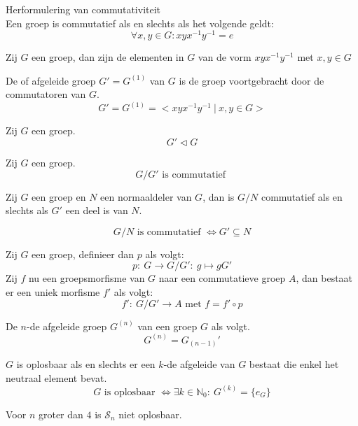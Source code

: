 \documentclass[main.tex]{subfiles}
\begin{document}
\begin{st}
Herformulering van commutativiteit\\
Een groep is commutatief als en slechts als het volgende geldt:
\[ \forall x,y \in G: xyx^{-1}y^{-1} = e \]
\end{st}

\begin{de}
Zij $G$ een groep, dan zijn de elementen in $G$ van de vorm $xyx^{-1}y^{-1}$ met $x,y\in G$ 
\end{de}

\begin{de}
De  of afgeleide groep $G' = G^{(1)}$ van $G$ is de groep voortgebracht door de commutatoren van $G$.
\[ G' = G^{(1)} = < xyx^{-1}y^{-1} \ |\ x,y\in G > \]
\end{de}

\begin{st}
Zij $G$ een groep.
\[ G' \triangleleft G \]
\end{st}

\begin{st}
Zij $G$ een groep.
\[ G/G' \text{ is commutatief } \]
\end{st}

\begin{st}
Zij $G$ een groep en $N$ een normaaldeler van $G$, dan is $G/N$ commutatief als en slechts als $G'$ een deel is van $N$.

\[ G/N \text{ is commutatief } \Leftrightarrow G' \subseteq N \]
\end{st}

\begin{st}
Zij $G$ een groep, definieer dan $p$ als volgt:
\[ p:\ G \rightarrow G/G':\ g \mapsto gG' \]
Zij $f$ nu een groepsmorfisme van $G$ naar een commutatieve groep $A$, dan bestaat er een uniek morfisme $f'$ als volgt:
\[ f':\ G/G' \rightarrow A \text{ met } f = f'\circ p \]
\end{st}

\begin{de}
De $n$-de afgeleide groep $G^{(n)}$ van een groep $G$ als volgt.
\[ G^{(n)} = G_{(n-1)}' \]
\end{de}

\begin{pr}
$G$ is oplosbaar als en slechts er een $k$-de afgeleide van $G$ bestaat die enkel het neutraal element bevat.
\[ G \text{ is oplosbaar } \Leftrightarrow \exists k\in\mathbb{N}_{0}:\ G^{(k)} = \{e_{G}\} \]
\end{pr}

\begin{st}
Voor $n$ groter dan $4$ is $\mathcal{S}_{n}$ niet oplosbaar.
\end{st}
\end{document}
